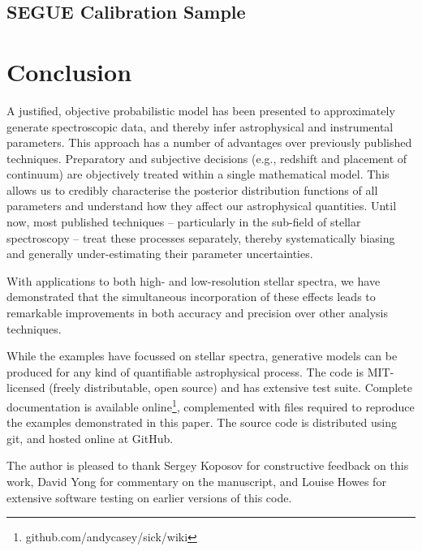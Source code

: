 \documentclass{aastex}
\begin{document}


\subsection{SEGUE Calibration Sample}




\section{Conclusion}

A justified, objective probabilistic model has been presented to approximately generate spectroscopic data, and thereby infer astrophysical and instrumental parameters. This approach has a number of advantages over previously published techniques. Preparatory and subjective decisions (e.g., redshift and placement of continuum) are objectively treated within a single mathematical model. This allows us to credibly characterise the posterior distribution functions of all parameters and understand how they affect our astrophysical quantities. Until now, most published techniques -- particularly in the sub-field of stellar spectroscopy -- treat these processes separately, thereby systematically biasing and generally under-estimating their parameter uncertainties.

With applications to both high- and low-resolution stellar spectra, we have demonstrated that the simultaneous incorporation of these effects leads to remarkable improvements in both accuracy and precision over other analysis techniques.





While the examples have focussed on stellar spectra, generative models can be produced for any kind of quantifiable astrophysical process. The code is MIT-licensed (freely distributable, open source) and has extensive test suite. Complete documentation is available online\footnote{github.com/andycasey/sick/wiki}, complemented with files required to reproduce the examples demonstrated in this paper. The source code is distributed using git, and hosted online at GitHub. 

\acknowledgements
The author is pleased to thank Sergey Koposov for constructive feedback on this work, David Yong for commentary on the manuscript, and Louise Howes for extensive software testing on earlier versions of this code.
\end{document}
